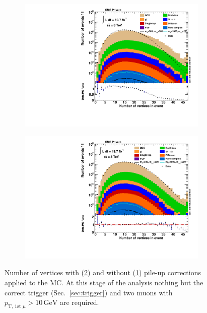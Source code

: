 \begin{figure}[htb!]
  \centering
  \begin{subfigure}[b]{0.495\textwidth}
    \centering
    \includegraphics[width=\textwidth]{plots/vtx_n_nopu.pdf}
    \caption{\label{fig:vtx_n_nopu}}
  \end{subfigure}
  \begin{subfigure}[b]{0.495\textwidth}
    \centering
    \includegraphics[width=\textwidth]{plots/vtx_n.pdf}
    \caption{\label{fig:vtx_n}}
  \end{subfigure}
  \caption{Number of vertices with (\ref{fig:vtx_n}) and without (\ref{fig:vtx_n_nopu}) pile-up corrections applied to the MC. At this stage of the analysis nothing but the correct trigger (Sec.~\ref{sec:trigger}) and two muons with $p_{\text{T, 1st }\mu} > 10\,\text{GeV}$ are required.}
  \label{fig:vtxn}
\end{figure}

